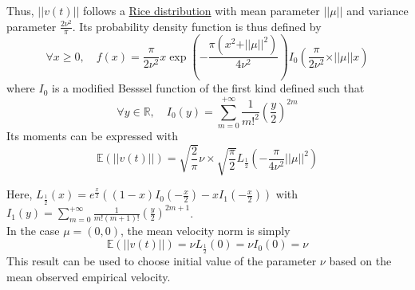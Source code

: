 \documentclass[11pt]{article}
\newcommand {\R}{\mathbb{R}}
\newcommand {\E}{\mathbb{E}}
\newcommand {\1}{\mathbb{1}}
\theoremstyle{definition}
\theoremstyle{remark}
\theoremstyle{remark}
\begin{document}
\begin{figure}[H]
	\centering
\end{figure}
Thus, $ \vert \vert v(t) \vert \vert$ follows a \href{https://en.wikipedia.org/wiki/Rice_distribution}{Rice distribution} with mean parameter $\vert \vert \mu \vert \vert$ and variance parameter $\frac{2\nu^2}{\pi}$. Its probability density function is thus defined by
\[\forall x \geq 0, \quad f(x)= \frac{\pi}{2\nu^2}x \exp\left(-\frac{\pi (x^2+ \vert \vert \mu \vert \vert^2)}{4\nu^2}\right) I_{0}\left(   \frac{\pi}{2\nu^2}\times \vert \vert \mu \vert \vert x \right)\]
where $I_0$ is a modified Besssel function of the first kind defined such that 
\[\forall y  \in \R, \quad I_0(y)=\sum_{m=0}^{+\infty} \frac{1}{m!^2}\left(\frac{y}{2}\right)^{2m}\]
Its moments can be expressed with
\[\E\left(\vert \vert v(t) \vert \vert\right)=\sqrt{\frac{2}{\pi}}\nu \times \sqrt{\frac{\pi}{2}} L_{\frac{1}{2}} \left( -\frac{\pi}{4\nu^2} \vert \vert \mu \vert \vert ^2 \right)\]

Here, $L_{\frac{1}{2}}(x)=e^{\frac{x}{2}} \left( (1-x) I_0\left( -\frac{x}{2}\right)-xI_1\left( -\frac{x}{2}\right)\right)$ with $I_1(y)=\sum_{m=0}^{+\infty} \frac{1}{m!(m+1)!}\left(\frac{y}{2}\right)^{2m+1}$.\\

In the case $\mu=(0,0)$, the mean velocity norm is simply 
\[\E(\vert \vert v(t) \vert \vert)=\nu L_{\frac{1}{2}}(0)=\nu I_{0}(0)=\nu\]
This result can be used to choose initial value of the parameter $\nu$ based on the mean observed empirical velocity.
\end{document}
